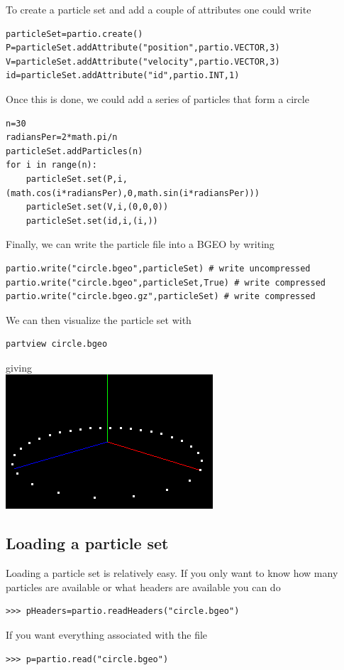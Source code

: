 \documentclass{article}
\begin{document}
To create a particle set and add a couple of attributes one could write
\begin{verbatim}
particleSet=partio.create()
P=particleSet.addAttribute("position",partio.VECTOR,3)
V=particleSet.addAttribute("velocity",partio.VECTOR,3)
id=particleSet.addAttribute("id",partio.INT,1)
\end{verbatim}
Once this is done, we could add a series of particles that form a circle
\begin{verbatim}
n=30
radiansPer=2*math.pi/n
particleSet.addParticles(n)
for i in range(n):
    particleSet.set(P,i,(math.cos(i*radiansPer),0,math.sin(i*radiansPer)))
    particleSet.set(V,i,(0,0,0))
    particleSet.set(id,i,(i,))
\end{verbatim}
Finally, we can write the particle file into a BGEO by writing 
\begin{verbatim}
partio.write("circle.bgeo",particleSet) # write uncompressed
partio.write("circle.bgeo",particleSet,True) # write compressed
partio.write("circle.bgeo.gz",particleSet) # write compressed
\end{verbatim}
We can then visualize the particle set with
\begin{verbatim}
partview circle.bgeo
\end{verbatim}
giving\\
\includegraphics{figures/circleFigure.png}


\subsection{Loading a particle set}

Loading a particle set is relatively easy.  If you only want to know how many particles are available or what headers are available you can do
\begin{verbatim}
>>> pHeaders=partio.readHeaders("circle.bgeo")
\end{verbatim}
If you want everything associated with the file
\begin{verbatim}
>>> p=partio.read("circle.bgeo")
\end{verbatim}
\end{document}

